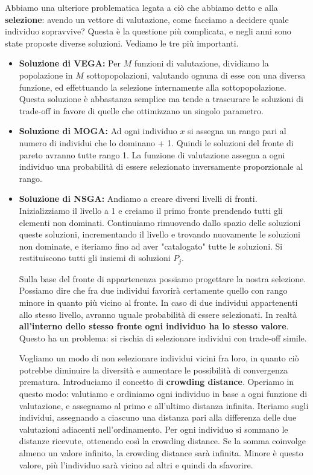        Abbiamo una ulteriore problematica legata a ciò che abbiamo detto e alla \textbf{selezione}: avendo un vettore di valutazione, come facciamo a decidere quale individuo sopravvive? Questa è la questione più complicata, e negli anni sono state proposte diverse soluzioni. Vediamo le tre più importanti.
        \begin{itemize}
            \item \textbf{Soluzione di VEGA:} Per $M$ funzioni di valutazione, dividiamo la popolazione in $M$ sottopopolazioni, valutando ognuna di esse con una diversa funzione, ed effettuando la selezione internamente alla sottopopolazione. Questa soluzione è abbastanza semplice ma tende a trascurare le soluzioni di trade-off in favore di quelle che ottimizzano un singolo parametro.
            
            \item \textbf{Soluzione di MOGA:} Ad ogni individuo $x$ si assegna un rango pari al numero di individui che lo dominano + 1. Quindi le soluzioni del fronte di pareto avranno tutte rango 1. La funzione di valutazione assegna a ogni individuo una probabilità di essere selezionato inversamente proporzionale al rango.
            
            \item \textbf{Soluzione di NSGA:} Andiamo a creare diversi livelli di fronti. Inizializziamo il livello a 1 e creiamo il primo fronte prendendo tutti gli elementi non dominati. Continuiamo rimuovendo dallo spazio delle soluzioni queste soluzioni, incrementando il livello e trovando nuovamente le soluzioni non dominate, e iteriamo fino ad aver "catalogato" tutte le soluzioni. Si restituiscono tutti gli insiemi di soluzioni $P_j$.
            
            Sulla base del fronte di appartenenza possiamo progettare la nostra selezione. Possiamo dire che fra due individui favorirà certamente quello con rango minore in quanto più vicino al fronte. In caso di due individui appartenenti allo stesso livello, avranno uguale probabilità di essere selezionati. In realtà \textbf{all'interno dello stesso fronte ogni individuo ha lo stesso valore}. Questo ha un problema: si rischia di selezionare individui con trade-off simile.
            
            Vogliamo un modo di non selezionare individui vicini fra loro, in quanto ciò potrebbe diminuire la diversità e aumentare le possibilità di convergenza prematura. Introduciamo il concetto di \textbf{crowding distance}. Operiamo in questo modo: valutiamo e ordiniamo ogni individuo in base a ogni funzione di valutazione, e assegnamo al primo e all'ultimo distanza infinita. Iteriamo sugli individui, assegnando a ciascuno una distanza pari alla differenza delle due valutazioni adiacenti nell'ordinamento. Per ogni individuo si sommano le distanze ricevute, ottenendo così la crowding distance. Se la somma coinvolge almeno un valore infinito, la crowding distance sarà infinita. Minore è questo valore, più l'individuo sarà vicino ad altri e quindi da sfavorire.
            

\end{itemize}
